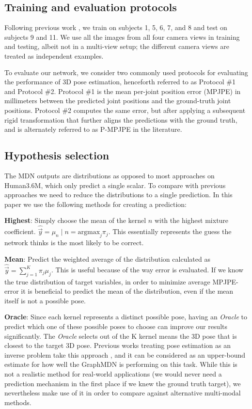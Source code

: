 \subsection{Training and evaluation protocols}\label{experiments_training}

   Following previous work \cite{Zhao_2019_CVPR, pavllo20193d, jahangiri2017generating, Li_2019_CVPR}, we train on subjects 1, 5, 6, 7, and 8 and test on subjects 9 and 11. We use all the images from all four camera views in training and testing, albeit not in a multi-view setup; the different camera views are treated as independent examples. 

   To evaluate our network, we consider two commonly used protocols for evaluating the performance of 3D pose estimation, henceforth referred to as Protocol \#1 and Protocol \#2. Protocol \#1 is the mean per-joint position error (MPJPE) in millimeters between the predicted joint positions and the ground-truth joint positions. Protocol \#2 computes the same error, but after applying a subsequent rigid transformation that further aligns the predictions with the ground truth, and is alternately referred to as P-MPJPE in the literature. 

\subsection{Hypothesis selection}
The MDN outputs are distributions as opposed to most approaches on Human3.6M, which only predict a single scalar. To compare with previous approaches we need to reduce the distributions to a single prediction. In this paper we use the following methods for creating a prediction:

\textbf{Highest}: Simply choose the mean of the kernel $n$ with the highest mixture coefficient. $\hat{\Vec{y}} = \mu_n \mid n = \text{argmax}_j\pi_j$. This essentially represents the guess the network thinks is the most likely to be correct.

\textbf{Mean}: Predict the weighted average of the distribution calculated as 
$\hat{\Vec{y}} = \sum_{j=1}^K \pi_j \mu_j$.
This is useful because of the way error is evaluated. If we know the true distribution of target variables, in order to minimize average MPJPE-error it is beneficial to predict the mean of the distribution, even if the mean itself is not a possible pose. 

\textbf{Oracle}: Since each kernel represents a distinct possible pose, having an \textit{Oracle} to predict which one of these possible poses to choose can improve our results significantly. The \textit{Oracle} selects out of the K kernel means the 3D pose that is closest to the target 3D pose. Previous works treating pose estimation as an inverse problem take this approach \cite{Li_2019_CVPR,jahangiri2017generating, Sharma_2019_ICCV}, and it can be considered as an upper-bound estimate for how well the GraphMDN is performing on this task. While this is not a realistic method for real-world applications (we would never need a prediction mechanism in the first place if we knew the ground truth target), we nevertheless make use of it in order to compare against alternative multi-modal methods.

